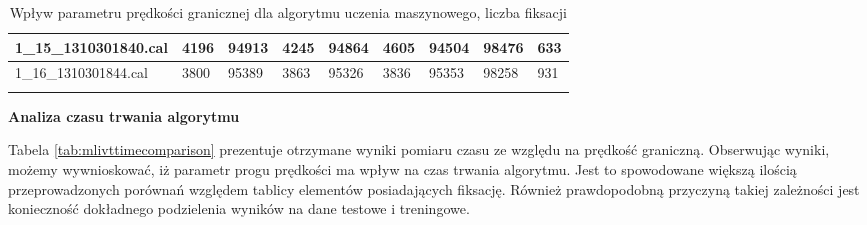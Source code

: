 {\begin{longtable}{l|l|l|l|l|l|l|l|l|}
    \multicolumn{1}{|l|}{1\_15\_1310301840.cal} & 4196 & \cellcolor[HTML]{EFEFEF}94913 & 4245 & \cellcolor[HTML]{EFEFEF}94864 & 4605 & \cellcolor[HTML]{EFEFEF}94504 & 98476 & \cellcolor[HTML]{EFEFEF}633 \\ \hline
    \multicolumn{1}{|l|}{1\_16\_1310301844.cal} & 3800 & \cellcolor[HTML]{EFEFEF}95389 & 3863 & \cellcolor[HTML]{EFEFEF}95326 & 3836 & \cellcolor[HTML]{EFEFEF}95353 & 98258 & \cellcolor[HTML]{EFEFEF}931 \\ \hline
    \caption{Wpływ parametru prędkości granicznej dla algorytmu uczenia maszynowego, liczba fiksacji}
    \label{tab:mlivtfixcomparison}\\
\end{longtable}
}
\textbf{Analiza czasu trwania algorytmu}\par
Tabela \ref{tab:mlivttimecomparison} prezentuje otrzymane wyniki pomiaru czasu ze względu na prędkość graniczną. Obserwując wyniki, możemy wywnioskować, iż parametr progu prędkości ma wpływ na czas trwania algorytmu. Jest to spowodowane większą ilością przeprowadzonych porównań względem tablicy elementów posiadających fiksację. Również prawdopodobną przyczyną takiej zależności jest konieczność dokładnego podzielenia wyników na dane testowe i treningowe.\par
